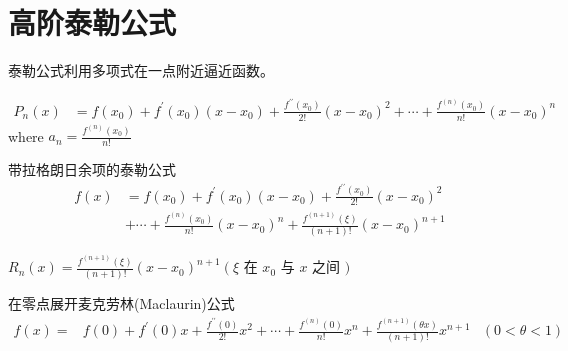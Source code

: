 \section{高阶泰勒公式}

    泰勒公式利用多项式在一点附近逼近函数。
    


\begin{corollary}[$n$阶泰勒多项式]
    \begin{equation} \begin{aligned} P_{n}(x) &=f\left(x_{0}\right)+f^{\prime}\left(x_{0}\right)\left(x-x_{0}\right)+\frac{f^{\prime \prime}\left(x_{0}\right)}{2 !}\left(x-x_{0}\right)^{2} +\cdots+\frac{f^{(n)}\left(x_{0}\right)}{n !}\left(x-x_{0}\right)^{n} \end{aligned} \end{equation}
    where $a_{n}=\frac{f^{(n)}\left(x_{0}\right)}{n !} $
\end{corollary}

\begin{corollary}[对于高阶余项的公式]
    带拉格朗日余项的泰勒公式
    \begin{equation} \begin{aligned} f(x) &=f\left(x_{0}\right)+f^{\prime}\left(x_{0}\right)\left(x-x_{0}\right)+\frac{f^{\prime \prime}\left(x_{0}\right)}{2 !}\left(x-x_{0}\right)^{2} \\ &+\cdots+\frac{f^{(n)}\left(x_{0}\right)}{n !}\left(x-x_{0}\right)^{n}+\frac{f^{(n+1)}(\xi)}{(n+1) !}\left(x-x_{0}\right)^{n+1} \end{aligned} \end{equation}

    $ R_{n}(x)=\frac{f^{(n+1)}(\xi)}{(n+1) !}\left(x-x_{0}\right)^{n+1}\left(\xi\right. $ 在 $ x_{0} $ 与 $ x  $ 之间 $ ) $
\end{corollary}

\begin{corollary}在零点展开麦克劳林(Maclaurin)公式
    \begin{equation} \begin{aligned} f(x)=& f(0)+f^{\prime}(0) x+\frac{f^{\prime \prime}(0)}{2 !} x^{2}+\cdots+\frac{f^{(n)}(0)}{n !} x^{n} +\frac{f^{(n+1)}(\theta x)}{(n+1) !} x^{n+1} &(0<\theta<1) \end{aligned} \end{equation}
    
\end{corollary}




